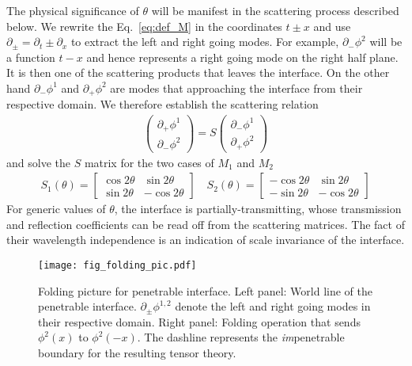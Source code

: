 The physical significance of $\theta$ will be manifest in the scattering process described below. We rewrite the Eq.~\eqref{eq:def_M} in the coordinates $t\pm x$ and use $\partial_{\pm} = \partial_{t} \pm \partial_x $ to extract the left and right going modes. For example, $\partial_{-} \phi^2$ will be a function $t - x$ and hence represents a right going mode on the right half plane. It is then one of the scattering products that leaves the interface. On the other hand $\partial_{-} \phi^1$ and $\partial_{+} \phi^2$ are modes that approaching the interface from their respective domain. We therefore establish the scattering relation 
\begin{equation}\begin{aligned}
\label{eq:def_S}
\begin{pmatrix}
\partial_+\phi^1\\
\partial_-\phi^2
\end{pmatrix}
=S
\begin{pmatrix}
\partial_-\phi^1\\
\partial_+\phi^2
\end{pmatrix}
\end{aligned}\end{equation}
and solve the $S$ matrix for the two cases of $M_1$ and $M_2$
\begin{equation}\begin{aligned}
\label{eq:S1_S2}
S_1(\theta)=\begin{bmatrix}
\cos 2\theta & \sin 2\theta \\
\sin 2\theta & -\cos 2\theta
\end{bmatrix}\quad
S_2(\theta)=\begin{bmatrix}
-\cos 2\theta & \sin 2\theta \\
-\sin 2\theta & -\cos 2\theta
\end{bmatrix}
\end{aligned}\end{equation}
For generic values of $\theta$, the interface is partially-transmitting, whose transmission and reflection coefficients can be read off from the scattering matrices. The fact of their wavelength independence is an indication of scale invariance of the interface.

\begin{figure}[h]
\centering
\texttt{[image: fig\_folding\_pic.pdf]}
\caption{Folding picture for penetrable interface. Left panel: World line of the penetrable interface. $\partial_\pm\phi^{1,2}$ denote the left and right going modes in their respective domain. Right panel: Folding operation that sends $\phi^2(x)$ to $\phi^2(-x)$. The dashline represents the \emph{im}penetrable boundary for the resulting tensor theory.}
\label{fig:folding_pic}
\end{figure}

